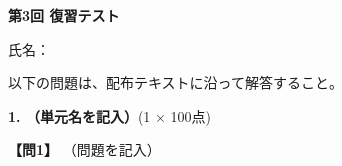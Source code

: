
\begin{center}
{\Large\textbf{第3回 復習テスト}}
\end{center}

\vspace{0.2em}
\begin{flushright}
氏名：\underline{\hspace{14em}}
\end{flushright}

\vspace{0.3em}
\noindent 以下の問題は、配布テキストに沿って解答すること。

\vspace{0.4em}
\noindent\textbf{1. （単元名を記入）}(1 $\times$ 100点)

\noindent\textbf{【問1】} （問題を記入）

\testqsep
